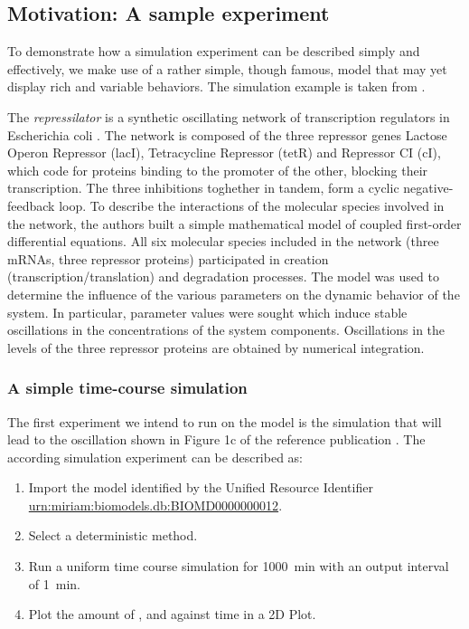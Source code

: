 \subsection{Motivation: A sample experiment}
\label{motivation:example}
To demonstrate how a simulation experiment can be described simply and effectively, we make use of a rather simple, though famous, model that may yet display rich and variable behaviors. The simulation example is taken from \citep{Waltemath:2010}. 

The \emph{repressilator} is a synthetic oscillating network of transcription regulators in Escherichia coli \citep{Elowitz:2000}.
 The network is composed of the three repressor genes Lactose Operon Repressor (lacI), Tetracycline Repressor (tetR) and Repressor CI (cI), which code for proteins binding to the promoter of the other, blocking their transcription. The three inhibitions toghether in tandem, form a cyclic negative-feedback loop. 
To describe the interactions of the molecular species involved in the network, the authors built a simple mathematical model of coupled first-order differential equations. All six molecular species included in the network (three mRNAs, three repressor proteins) participated in creation (transcription/translation) and degradation processes. The model was used to determine the influence of the various parameters on the dynamic behavior of the system. In particular, parameter values were sought which induce stable oscillations in the concentrations of the system components. Oscillations in the levels of the three repressor proteins are obtained by numerical integration. 

\subsubsection{A simple time-course simulation}
\label{sec:intro1}
The first experiment we intend to run on the model is the simulation that will lead to the oscillation shown in Figure 1c of the reference publication \citep{Elowitz:2000}. The according simulation experiment can be described as:

\begin{enumerate}
	\item{Import the model identified by the Unified Resource Identifier \citep{Berners-Lee:2005} \url{urn:miriam:biomodels.db:BIOMD0000000012}.}


	\item{Select a deterministic method.}
	\item{Run a uniform time course simulation for 1000~min with an output interval of 1~min.}
	\item{Plot the amount of ,  and  against time in a 2D Plot.}
\end{enumerate}

